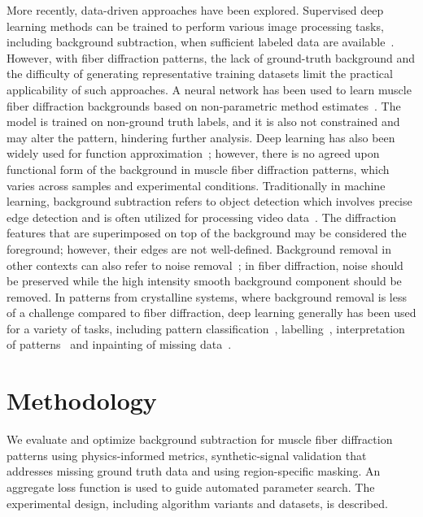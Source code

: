 \documentclass[iucr]{iucrjournals}
\begin{document}
More recently, data-driven approaches have been explored. Supervised deep learning methods can be trained to perform various image processing tasks, including background subtraction, when sufficient labeled data are available~\cite{archana2024dl_image_processing_review}. However, with fiber diffraction patterns, the lack of ground-truth background and the difficulty of generating representative training datasets limit the practical applicability of such approaches. A neural network has been used to learn muscle fiber diffraction backgrounds based on non-parametric method estimates~\cite{ArangurenCarmona2020}. The model is trained on non-ground truth labels, and it is also not constrained and may alter the pattern, hindering further analysis. Deep learning has also been widely used for function approximation~\cite{devore2021nn_approximation}; however, there is no agreed upon functional form of the background in muscle fiber diffraction patterns, which varies across samples and experimental conditions. Traditionally in machine learning, background subtraction refers to object detection which involves precise edge detection and is often utilized for processing video data~\cite{bouwmans2019dnn_background_subtraction}. The diffraction features that are superimposed on top of the background may be considered the foreground; however, their edges are not well-defined. Background removal in other contexts can also refer to noise removal~\cite{jiang2025efficient_denoising_survey}; in fiber diffraction, noise should be preserved while the high intensity smooth background component should be removed.  In patterns from crystalline systems, where background removal is less of a challenge compared to fiber diffraction, deep learning generally has been used for a variety of tasks, including pattern classification~\cite{aguiar2020crystallographic_prediction, ziletti2018dl_crystal_classification}, labelling~\cite{chavez2025mlexchange_labeling}, interpretation of patterns~\cite{szymanski2021probabilistic_multiphase_xrd} and inpainting of missing data~\cite{chavez2022dl_inpainting_xray,roberts2024dlsia}.

\section{Methodology}

We evaluate and optimize background subtraction for muscle fiber diffraction patterns using physics-informed metrics, synthetic-signal validation that addresses missing ground truth data and using region-specific masking. An aggregate loss function is used to guide automated parameter search. The experimental design, including algorithm variants and datasets, is described.
\end{document}
